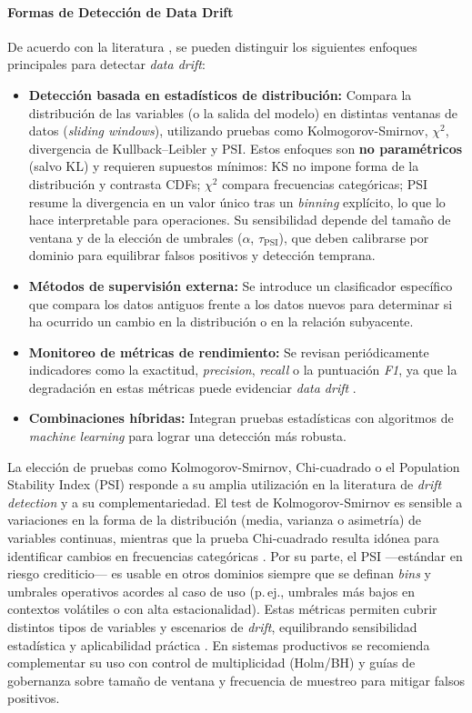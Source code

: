 \paragraph{Formas de Detección de Data Drift}
De acuerdo con la literatura \citep{Lu2019, Gama2014, BaenaGarcia2006}, se pueden distinguir los siguientes enfoques principales para detectar \textit{data drift}:
\begin{itemize}
    \item \textbf{Detección basada en estadísticos de distribución:} Compara la distribución de las variables (o la salida del modelo) en distintas ventanas de datos (\textit{sliding windows}), utilizando pruebas como Kolmogorov-Smirnov, $\chi^2$, divergencia de Kullback–Leibler y PSI. Estos enfoques son \textbf{no paramétricos} (salvo KL) y requieren supuestos mínimos: KS no impone forma de la distribución y contrasta CDFs; $\chi^2$ compara frecuencias categóricas; PSI resume la divergencia en un valor único tras un \textit{binning} explícito, lo que lo hace interpretable para operaciones. Su sensibilidad depende del tamaño de ventana y de la elección de umbrales ($\alpha$, $\tau_{\text{PSI}}$), que deben calibrarse por dominio para equilibrar falsos positivos y detección temprana.
    \item \textbf{Métodos de supervisión externa:} Se introduce un clasificador específico que compara los datos antiguos frente a los datos nuevos para determinar si ha ocurrido un cambio en la distribución o en la relación subyacente.
    \item \textbf{Monitoreo de métricas de rendimiento:} Se revisan periódicamente indicadores como la exactitud, \textit{precision}, \textit{recall} o la puntuación \textit{F1}, ya que la degradación en estas métricas puede evidenciar \textit{data drift} \citep{Bifet2010}.
    \item \textbf{Combinaciones híbridas:} Integran pruebas estadísticas con algoritmos de \textit{machine learning} para lograr una detección más robusta.
\end{itemize}

La elección de pruebas como Kolmogorov-Smirnov, Chi-cuadrado o el Population Stability Index (PSI) responde a su amplia utilización en la literatura de \textit{drift detection} y a su complementariedad. El test de Kolmogorov-Smirnov es sensible a variaciones en la forma de la distribución (media, varianza o asimetría) de variables continuas, mientras que la prueba Chi-cuadrado resulta idónea para identificar cambios en frecuencias categóricas \citep{Sethi2017}. Por su parte, el PSI —estándar en riesgo crediticio— es usable en otros dominios siempre que se definan \textit{bins} y umbrales operativos acordes al caso de uso (p.\,ej., umbrales más bajos en contextos volátiles o con alta estacionalidad). Estas métricas permiten cubrir distintos tipos de variables y escenarios de \textit{drift}, equilibrando sensibilidad estadística y aplicabilidad práctica \citep{Gama2014, Zliobaite2016}. En sistemas productivos se recomienda complementar su uso con control de multiplicidad (Holm/BH) y guías de gobernanza sobre tamaño de ventana y frecuencia de muestreo para mitigar falsos positivos.

